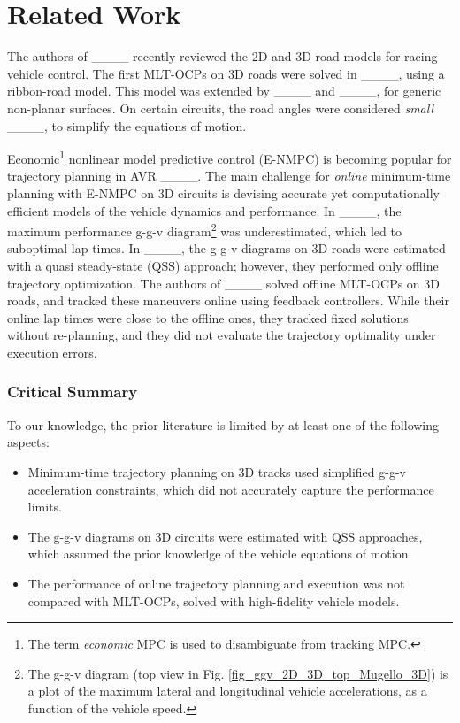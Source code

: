 \section{Related Work}
\label{sec_related_work}
%
The authors of ____ recently reviewed the 2D and 3D road models for racing vehicle control.
The first MLT-OCPs on 3D roads were solved in ____, using a ribbon-road model. This model was extended by ____ and ____, for generic non-planar surfaces.
On certain circuits, the road angles were considered \textit{small} ____, to simplify the equations of motion.

Economic\footnote{The term \textit{economic} MPC is used to disambiguate from tracking MPC.} nonlinear model predictive control (E-NMPC) is becoming popular for trajectory planning in AVR ____.
The main challenge for \textit{online} minimum-time planning with E-NMPC on 3D circuits is devising accurate yet computationally efficient models of the vehicle dynamics and performance.
In ____, the maximum performance g-g-v diagram\footnote{The g-g-v diagram (top view in Fig. \ref{fig_ggv_2D_3D_top_Mugello_3D}) is a plot of the maximum lateral and longitudinal vehicle accelerations, as a function of the vehicle speed.} was underestimated, which led to suboptimal lap times. In ____, the g-g-v diagrams on 3D roads were estimated with a quasi steady-state (QSS) approach; however, they performed only offline trajectory optimization.
The authors of ____ solved offline MLT-OCPs on 3D roads, and tracked these maneuvers online using feedback controllers. While their online lap times were close to the offline ones, they tracked fixed solutions without re-planning, and they did not evaluate the trajectory optimality under execution errors.
%
\subsubsection*{Critical Summary}
%
To our knowledge, the prior literature is limited by at least one of the following aspects:
%
\begin{itemize}
	\item Minimum-time trajectory planning on 3D tracks used simplified g-g-v acceleration constraints, which did not accurately capture the performance limits.
	\item The g-g-v diagrams on 3D circuits were estimated with QSS approaches, which assumed the prior knowledge of the vehicle equations of motion.
	\item The performance of online trajectory planning and execution was not compared with MLT-OCPs, solved with high-fidelity vehicle models.
\end{itemize}
%